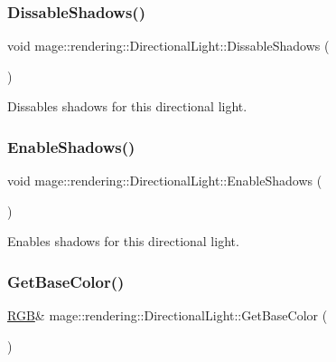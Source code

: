 \subsubsection{\texorpdfstring{Dissable\+Shadows()}{DissableShadows()}}
{\footnotesize\ttfamily void mage\+::rendering\+::\+Directional\+Light\+::\+Dissable\+Shadows (\begin{DoxyParamCaption}{ }\end{DoxyParamCaption})\hspace{0.3cm}{\ttfamily [noexcept]}}

Dissables shadows for this directional light. \hypertarget{classmage_1_1rendering_1_1_directional_light_abafdec9ce9ca0263724ce8ddba430b1b}{}\label{classmage_1_1rendering_1_1_directional_light_abafdec9ce9ca0263724ce8ddba430b1b} 
\subsubsection{\texorpdfstring{Enable\+Shadows()}{EnableShadows()}}
{\footnotesize\ttfamily void mage\+::rendering\+::\+Directional\+Light\+::\+Enable\+Shadows (\begin{DoxyParamCaption}{ }\end{DoxyParamCaption})\hspace{0.3cm}{\ttfamily [noexcept]}}

Enables shadows for this directional light. \hypertarget{classmage_1_1rendering_1_1_directional_light_a492e5d6a02efa369437b606be8401985}{}\label{classmage_1_1rendering_1_1_directional_light_a492e5d6a02efa369437b606be8401985} 
\subsubsection{\texorpdfstring{Get\+Base\+Color()}{GetBaseColor()}\hspace{0.1cm}{\footnotesize\ttfamily [1/2]}}
{\footnotesize\ttfamily \hyperlink{structmage_1_1_r_g_b}{R\+GB}\& mage\+::rendering\+::\+Directional\+Light\+::\+Get\+Base\+Color (\begin{DoxyParamCaption}{ }\end{DoxyParamCaption})\hspace{0.3cm}{\ttfamily [noexcept]}}

